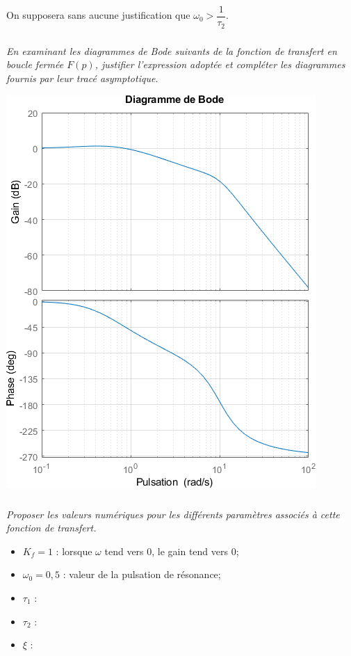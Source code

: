 \documentclass[10pt,fleqn]{article} %
\begin{document}
\begin{multicols}{2}
On supposera sans aucune justification que $\omega_0 > \dfrac{1}{\tau_2}$.

\subparagraph{}\textit{En examinant les diagrammes de Bode suivants de la fonction de transfert en boucle fermée $F(p)$, justifier l’expression adoptée et
compléter les diagrammes fournis par leur tracé asymptotique.}

\begin{center}
\includegraphics[width=\linewidth]{images/Q06.png}
\end{center}


\ifprof
\begin{corrige}
\end{corrige}
\else
\fi


\subparagraph{}\textit{Proposer les valeurs numériques pour les différents paramètres associés à
cette fonction de transfert.}
\ifprof
\begin{corrige}
\begin{itemize}
\item $K_f=1$ : lorsque $\omega$ tend vers 0, le gain tend vers 0;
\item $\omega_0  = 0,5$ : valeur de la pulsation de résonance; 
\item $\tau_1$ :
\item $\tau_2$ :
\item $\xi$ :


\end{itemize}
\end{corrige}
\end{multicols}
\end{document}
